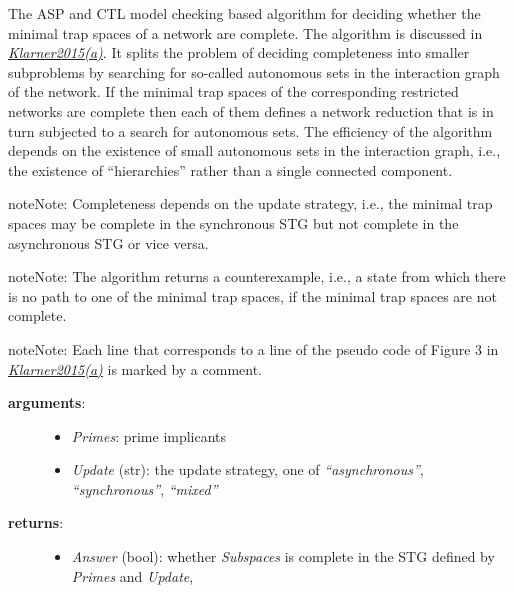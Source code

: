 \documentclass[letterpaper,10pt,english]{sphinxmanual}
\begin{document}
\begin{fulllineitems}
\label{AttractorDetection:PyBoolNet.AttractorDetection.completeness}
The ASP and CTL model checking based algorithm for deciding whether the minimal trap spaces of a network are complete.
The algorithm is discussed in {\hyperref[Bibliography:klarner2015trap]{\emph{Klarner2015(a)}}}.
It splits the problem of deciding completeness into smaller subproblems by searching for so-called autonomous sets in the
interaction graph of the network.
If the minimal trap spaces of the corresponding restricted networks are complete
then each of them defines a network reduction that is in turn subjected to a search for autonomous sets.
The efficiency of the algorithm depends on the existence of small autonomous sets in the interaction graph, i.e.,
the existence of ``hierarchies'' rather than a single connected component.

\begin{notice}{note}{Note:}
Completeness depends on the update strategy, i.e.,
the minimal trap spaces may be complete in the synchronous STG but not complete in the asynchronous STG or vice versa.
\end{notice}

\begin{notice}{note}{Note:}
The algorithm returns a counterexample, i.e., a state from which there is no path to one of the minimal trap spaces,
if the minimal trap spaces are not complete.
\end{notice}

\begin{notice}{note}{Note:}
Each line that corresponds to a line of the pseudo code of Figure 3 in {\hyperref[Bibliography:klarner2015trap]{\emph{Klarner2015(a)}}} is marked by a comment.
\end{notice}
\begin{description}
\item[{\textbf{arguments}:}] \leavevmode\begin{itemize}
\item {} 
\emph{Primes}: prime implicants

\item {} 
\emph{Update} (str): the update strategy, one of \emph{``asynchronous''}, \emph{``synchronous''}, \emph{``mixed''}

\end{itemize}

\item[{\textbf{returns}:}] \leavevmode\begin{itemize}
\item {} 
\emph{Answer} (bool): whether \emph{Subspaces} is complete in the STG defined by \emph{Primes} and \emph{Update},


\end{itemize}
\end{description}
\end{fulllineitems}
\end{document}
